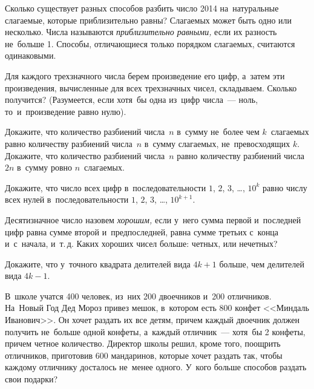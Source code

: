 


\begin{problems}

\item
Сколько существует разных способов разбить число 2014 на~натуральные слагаемые,
которые приблизительно равны?
Слагаемых может быть одно или несколько.
Числа называются \emph{приблизительно равными,} если их разность не~больше 1.
Способы, отличающиеся только порядком слагаемых, считаются одинаковыми.

\item
Для каждого трехзначного числа берем произведение его цифр, а~затем эти
произведения, вычисленные для всех трехзначных чисел, складываем.
Сколько получится?
(Разумеется, если хотя~бы одна из~цифр числа~--- ноль, то~и~произведение равно
нулю).

\item
\subproblem
Докажите, что количество разбиений числа~$n$ в~сумму не~более чем
$k$~слагаемых равно количеству разбиений числа~$n$ в~сумму слагаемых,
не~превосходящих $k$.
\\
\subproblem
Докажите, что количество разбиений числа~$n$ равно количеству разбиений
числа~$2n$ в~сумму ровно $n$~слагаемых.

\item
Докажите, что число всех цифр в~последовательности
$1$, $2$, $3$, \ldots, $10^{k}$ равно числу всех нулей в~последовательности
$1$, $2$, $3$, \ldots, $10^{k+1}$.

\item
Десятизначное число назовем \emph{хорошим,} если у~него сумма первой
и~последней цифр равна сумме второй и~предпоследней, равна сумме третьих
с~конца и~с~начала, и~т.\,д.
Каких хороших чисел больше: четных, или нечетных?

\item
Докажите, что у~точного квадрата делителей вида $4k + 1$ больше, чем делителей
вида $4 k - 1$.

\item
В~школе учатся 400 человек, из~них 200 двоечников и~200 отличников.
На~Новый Год Дед Мороз привез мешок, в~котором есть 800 конфет
<<Миндаль Иванович>>.
Он хочет раздать их все детям, причем каждый двоечник должен получить не~больше
одной конфеты, а~каждый отличник~--- хотя~бы 2 конфеты, причем четное
количество.
Директор школы решил, кроме того, поощрить отличников, приготовив
600 мандаринов, которые хочет раздать так, чтобы каждому отличнику досталось
не~менее одного.
У~кого больше способов раздать свои подарки?


\end{problems}

